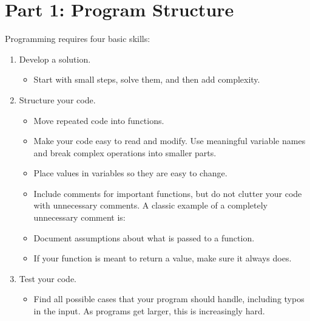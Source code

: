 \documentclass[letterpaper,10pt,english]{sphinxmanual}
\begin{document}
\section{Part 1: Program Structure}
\label{\detokenize{lecture_notes/lec11_conditionals2:part-1-program-structure}}
Programming requires four basic skills:
\begin{enumerate}
\def\theenumi{\arabic{enumi}}
\def\labelenumi{\theenumi .}
\makeatletter\def\p@enumii{\p@enumi \theenumi .}\makeatother
\item {} 
Develop a solution.
\begin{itemize}
\item {} 
Start with small steps, solve them, and then add complexity.

\end{itemize}

\item {} 
Structure your code.
\begin{itemize}
\item {} 
Move repeated code into functions.

\item {} 
Make your code easy to read and modify. Use meaningful variable names
and break complex operations into smaller parts.

\item {} 
Place values in variables so they are easy to change.

\item {} 
Include comments for important functions, but do not clutter
your code with unnecessary comments. A classic example of a
completely unnecessary comment is:

\begin{sphinxVerbatim}[commandchars=\\\{\}]
     
\end{sphinxVerbatim}

\item {} 
Document assumptions about what is passed to a function.

\item {} 
If your function is meant to return a value, make sure it always
does.

\end{itemize}

\item {} 
Test your code.
\begin{itemize}
\item {} 
Find all possible cases that your program should handle, including typos
in the input. As
programs get larger, this is increasingly hard.


\end{itemize}
\end{enumerate}
\end{document}
